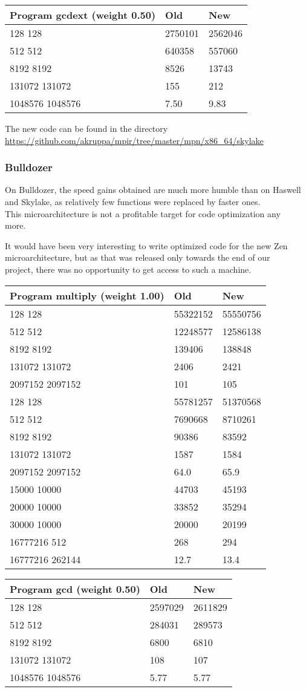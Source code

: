 \begin{longtable}[c]{@{}lll@{}}
\toprule
Program gcdext (weight 0.50) & Old & New\tabularnewline
\midrule
\endhead
128 128 & 2750101 & 2562046\tabularnewline
512 512 & 640358 & 557060\tabularnewline
8192 8192 & 8526 & 13743\tabularnewline
131072 131072 & 155 & 212\tabularnewline
1048576 1048576 & 7.50 & 9.83\tabularnewline
\bottomrule
\end{longtable}

The new code can be found in the directory\\
\url{https://github.com/akruppa/mpir/tree/master/mpn/x86_64/skylake}

\subsubsection{Bulldozer}\label{bulldozer}

On Bulldozer, the speed gains obtained are much more humble than on
Haswell\\
and Skylake, as relatively few functions were replaced by faster ones.\\
This microarchitecture is not a profitable target for code optimization
any\\
more.

It would have been very interesting to write optimized code for the new
Zen\\
microarchitecture, but as that was released only towards the end of
our\\
project, there was no opportunity to get access to such a machine.

\begin{longtable}[c]{@{}lll@{}}
\toprule
Program multiply (weight 1.00) & Old & New\tabularnewline
\midrule
\endhead
128 128 & 55322152 & 55550756\tabularnewline
512 512 & 12248577 & 12586138\tabularnewline
8192 8192 & 139406 & 138848\tabularnewline
131072 131072 & 2406 & 2421\tabularnewline
2097152 2097152 & 101 & 105\tabularnewline
128 128 & 55781257 & 51370568\tabularnewline
512 512 & 7690668 & 8710261\tabularnewline
8192 8192 & 90386 & 83592\tabularnewline
131072 131072 & 1587 & 1584\tabularnewline
2097152 2097152 & 64.0 & 65.9\tabularnewline
15000 10000 & 44703 & 45193\tabularnewline
20000 10000 & 33852 & 35294\tabularnewline
30000 10000 & 20000 & 20199\tabularnewline
16777216 512 & 268 & 294\tabularnewline
16777216 262144 & 12.7 & 13.4\tabularnewline
\bottomrule
\end{longtable}

\begin{longtable}[c]{@{}lll@{}}
\toprule
Program gcd (weight 0.50) & Old & New\tabularnewline
\midrule
\endhead
128 128 & 2597029 & 2611829\tabularnewline
512 512 & 284031 & 289573\tabularnewline
8192 8192 & 6800 & 6810\tabularnewline
131072 131072 & 108 & 107\tabularnewline
1048576 1048576 & 5.77 & 5.77\tabularnewline
\bottomrule
\end{longtable}

